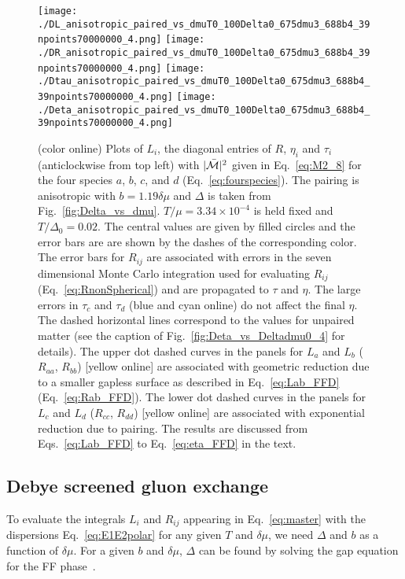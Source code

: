 \documentclass[10pt, aps, prd, superscriptaddress, nofootinbib, 
               amsmath, amssymb, twocolumn,
               preprintnumbers, showpacs,
               raggedbottom,
               floatfix]{revtex4-1}
\newcommand{\calM}{{\cal{M}}}
\begin{document}
\begin{figure*}[tbp]
\texttt{[image: ./DL\_anisotropic\_paired\_vs\_dmuT0\_100Delta0\_675dmu3\_688b4\_39npoints70000000\_4.png]}
\texttt{[image: ./DR\_anisotropic\_paired\_vs\_dmuT0\_100Delta0\_675dmu3\_688b4\_39npoints70000000\_4.png]}
\texttt{[image: ./Dtau\_anisotropic\_paired\_vs\_dmuT0\_100Delta0\_675dmu3\_688b4\_39npoints70000000\_4.png]}
\texttt{[image: ./Deta\_anisotropic\_paired\_vs\_dmuT0\_100Delta0\_675dmu3\_688b4\_39npoints70000000\_4.png]}
  \caption{(color online) Plots of $L_i$, the diagonal entries of $R$, $\eta_i$
  and $\tau_i$ (anticlockwise from top left)  with $|\bar{\calM}|^2$ given in
  Eq.~\ref{eq:M2_8} for the four species $a$, $b$, $c$, and $d$
  (Eq.~\ref{eq:fourspecies}). The pairing is anisotropic with $b=1.19\delta\mu$
  and $\Delta$ is taken from Fig.~\ref{fig:Delta_vs_dmu}.
  $T/\mu=3.34\times10^{-4}$ is held fixed and $T/\Delta_0=0.02$. The central
  values are given by filled circles and the error bars are are shown by the
  dashes of the corresponding color. The error bars for $R_{ij}$ are associated
  with errors in the seven dimensional Monte Carlo integration used for
  evaluating $R_{ij}$ (Eq.~\ref{eq:RnonSpherical}) and are propagated to $\tau$
  and $\eta$. The large errors in $\tau_{c}$ and $\tau_{d}$ (blue and cyan
  online) do not affect the
  final $\eta$. The dashed horizontal lines correspond to the values for
  unpaired matter (see the caption of Fig.~\ref{fig:Deta_vs_Deltadmu0_4} for
  details). The upper dot dashed curves in the panels for $L_a$ and $L_b$
  ($R_{aa}$, $R_{bb}$) [yellow online] are associated with geometric reduction
  due to a smaller gapless surface as described in Eq.~\ref{eq:Lab_FFD}
  (Eq.~\ref{eq:Rab_FFD}). The lower dot dashed curves in the panels for $L_c$
  and $L_d$ ($R_{cc}$, $R_{dd}$) [yellow online] are associated with
  exponential reduction due to pairing. The results are discussed from Eqs.~\ref{eq:Lab_FFD}
  to Eq.~\ref{eq:eta_FFD} in the text.  ~\label{fig:Deta_vs_dmu_aniso} }
  \end{figure*}

\subsection{Debye screened gluon exchange}
\label{sec:simple_anisotropic}
To evaluate the integrals $L_i$ and $R_{ij}$ appearing in Eq.~\ref{eq:master} with the
dispersions Eq.~\ref{eq:E1E2polar} for any given $T$ and $\delta\mu$, we need
$\Delta$ and $b$ as a function of $\delta\mu$.  For a given $b$ and
$\delta\mu$, $\Delta$ can be found by solving the gap equation for the FF phase~\cite{Mannarelli:2006}.
\end{document}
